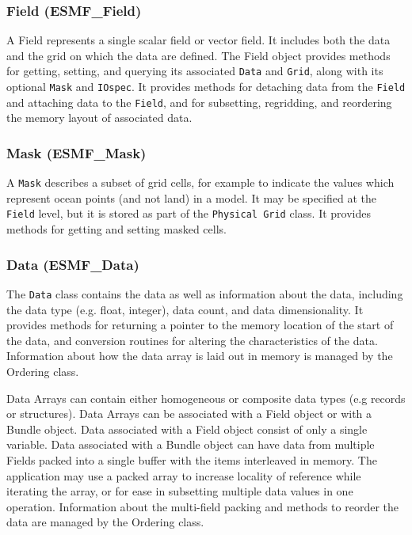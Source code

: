 \subsubsection{Field (ESMF\_Field)}
\label{sec:field} 
A Field represents a single scalar field or vector field.  It includes 
both the data and the grid on which the data are defined.  The Field object provides
methods for getting, setting, and querying its associated {\tt Data} and {\tt Grid},
along with its optional {\tt Mask} and {\tt IOspec}.  It provides methods for detaching 
data from the {\tt Field} and attaching data to the {\tt Field}, and for subsetting, 
regridding, and reordering the memory layout of associated data.

\subsubsection{Mask (ESMF\_Mask)}
\label{sec:mask} 
A {\tt Mask} describes a subset of grid cells, for example to indicate
the values which represent ocean points (and not land) in a model.  
It may be specified at the {\tt Field} level, but it is stored as part 
of the {\tt Physical Grid} class.  It provides methods for getting 
and setting masked cells.

\subsubsection{Data (ESMF\_Data)}
\label{sec:dataarray} 
The {\tt Data} class contains the data as well as information 
about the data, including the data type (e.g. float,
integer), data count, and data dimensionality.  
It provides methods for returning a pointer to the memory 
location of the start of the data, and conversion routines 
for altering the characteristics of the data.  
Information about how the data array is laid
out in memory is managed by the Ordering class.

Data Arrays can contain either homogeneous or composite data types 
(e.g records or structures).
Data Arrays can be associated with a Field object or with a Bundle object.
Data associated with a Field object consist of only a single variable.  
Data associated
with a Bundle object can have data from multiple Fields packed into a single
buffer with the items interleaved in memory.  
The application may use a packed array to increase
locality of reference while iterating the array, 
or for ease in subsetting multiple data values in one operation.
Information about the multi-field packing and methods to reorder the
data are managed by the Ordering class.


